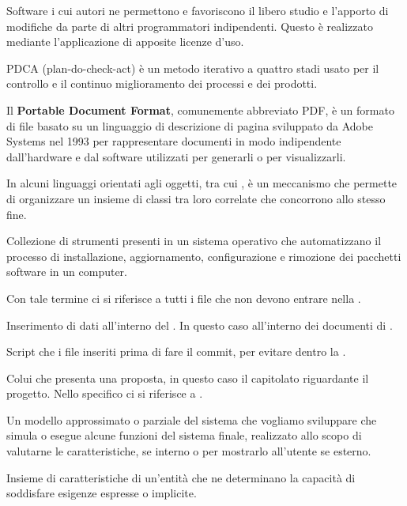 
Software i cui autori ne permettono e favoriscono il libero studio e l'apporto di modifiche da parte di altri programmatori indipendenti. Questo è realizzato mediante l'applicazione di apposite licenze d'uso.


PDCA (plan-do-check-act) è un metodo iterativo a quattro stadi usato per il controllo e il continuo miglioramento dei processi e dei prodotti.

Il \textbf{Portable Document Format}, comunemente abbreviato PDF, è un formato di file basato su un linguaggio di descrizione di pagina sviluppato da Adobe Systems nel 1993 per rappresentare documenti in modo indipendente dall'hardware e dal software utilizzati per generarli o per visualizzarli. 

In alcuni linguaggi orientati agli oggetti, tra cui , è un meccanismo che permette di organizzare un insieme di classi tra loro correlate che concorrono allo stesso fine.

Collezione di strumenti presenti in un sistema operativo che automatizzano il processo di installazione, aggiornamento, configurazione e rimozione dei pacchetti software in un computer.

Con tale termine ci si riferisce a tutti i file che non devono entrare nella .

Inserimento di dati all'interno del . In questo caso all'interno dei documenti di .

Script che  i file inseriti prima di fare il commit, per evitare  dentro la .

Colui che presenta una proposta, in questo caso il capitolato riguardante il progetto.
Nello specifico ci si riferisce a \Proponente{}.

Un modello approssimato o parziale del sistema che vogliamo sviluppare che simula o esegue alcune funzioni del sistema finale, realizzato allo scopo di valutarne le caratteristiche, se interno o per mostrarlo all'utente se esterno.


Insieme di caratteristiche di un'entità che ne determinano la capacità di soddisfare esigenze espresse o implicite.

